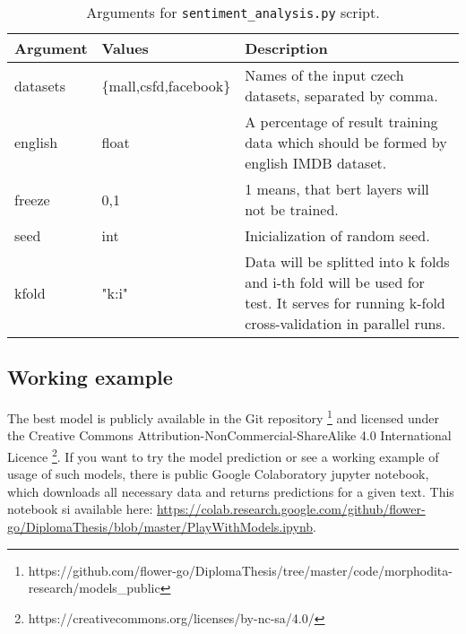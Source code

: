 \begin{table}
\centering
\begin{tabular}{ |p{2cm}|p{}|p{6cm}| } 
 \hline
 Argument & Values & Description \\ 
 \hline \hline
 datasets & \{mall,csfd,facebook\} &  Names of the input czech datasets, separated by comma. \\ \hline
 english & float & A percentage of result training data which should be formed by english IMDB dataset.\\ \hline
 
 freeze & {0,1} & 1 means, that bert layers will not be trained. \\ \hline
 seed & int & Inicialization of random seed. \\ \hline
 kfold & "k:i" & Data will be splitted into k folds and i-th fold will be used for test. It serves for running k-fold cross-validation in parallel runs. \\ \hline
 
 \hline
\end{tabular}
\caption{Arguments for \texttt{sentiment\_analysis.py} script.} 
\label{Tab:sent_args}
\end{table}

\subsection{Working example}
The best model is publicly available in the Git repository \footnote{https://github.com/flower-go/DiplomaThesis/tree/master/code/morphodita-research/models\_public} %
 and licensed under the Creative Commons Attribution-NonCommercial-ShareAlike 4.0 International Licence \footnote{https://creativecommons.org/licenses/by-nc-sa/4.0/}. If you want to try the model prediction or see a working example of usage of such models, there is public Google Colaboratory \citep{colab} jupyter notebook, which downloads all necessary data and returns predictions for a given text. This notebook si available here: \url{https://colab.research.google.com/github/flower-go/DiplomaThesis/blob/master/PlayWithModels.ipynb}. 






